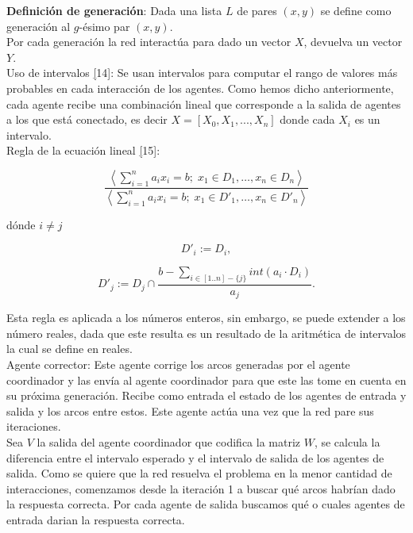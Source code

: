 \documentclass{article}
\begin{document}
        \textbf{Definición de generación}: Dada una lista $L$ de pares $(x,y)$ se define como generación al $g$-ésimo par $(x,y)$. \\

        Por cada generación la red interactúa para dado un vector $X$, devuelva un vector $Y$.\\

        Uso de intervalos \hyperref[sec:24][14]: Se usan intervalos para computar el rango de valores más probables en cada interacción de los agentes. Como hemos dicho anteriormente, cada agente recibe una combinación lineal
        que corresponde a la salida de agentes a los que está conectado, es decir $X=[X_0,X_1,...,X_n]$ donde cada $X_i$ es un intervalo. \\
        
        Regla de la ecuación lineal \hyperref[sec:25][15]:
        
                $$\frac{\left\langle \sum_{i=1}^{n} a_i x_i = b ; \; x_1 \in D_1, \ldots, x_n \in D_n \right\rangle}
                {\left\langle \sum_{i=1}^{n} a_i x_i = b ; \; x_1 \in D'_1, \ldots, x_n \in D'_n \right\rangle}$$
            
            dónde $i \neq j$
                
            \[ D'_i := D_i, \]

            \[ D'_j := D_j \cap \frac{b - \sum_{i \in [1..n] - \{j\}} int(a_i \cdot D_i)}{a_j}. \]

            Esta regla es aplicada a los números enteros, sin embargo, se puede extender a los número reales, dada que este resulta es un resultado de la aritmética de intervalos la cual se define en reales.\\
    
        Agente corrector: Este agente corrige los arcos generadas por el agente coordinador y las envía al agente coordinador para que este las tome en cuenta en su próxima generación. Recibe como entrada el estado de los agentes de entrada y salida y los arcos entre estos. Este agente actúa una vez que la red pare sus iteraciones. \\

        Sea $V$ la salida del agente coordinador que codifica la matriz $W$, se calcula la diferencia entre el intervalo esperado y el intervalo de salida de los agentes de salida. 
        Como se quiere que la red resuelva el problema en la menor cantidad de interacciones, comenzamos desde la iteración 1 a buscar qué arcos habrían dado la 
        respuesta correcta. Por cada agente de salida buscamos qué o cuales agentes de entrada darian la respuesta correcta.  \\
        
\end{document}
